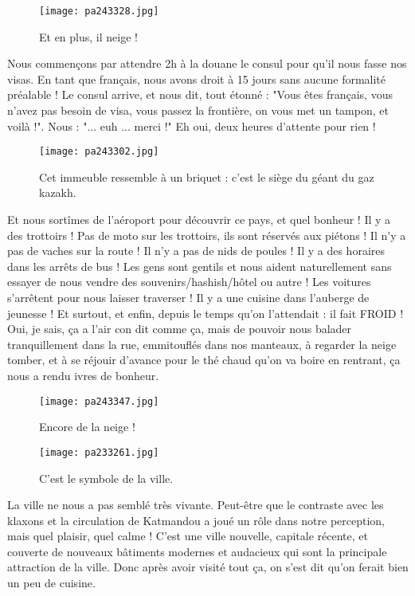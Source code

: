 \documentclass{book}
\begin{document}
\begin{figure}[h]
\centering
\texttt{[image: pa243328.jpg]}
\caption*{Et en plus, il neige !}
\end{figure}

Nous commençons par attendre 2h à la douane le consul pour qu'il nous fasse nos visas. En tant que français, nous avons droit à 15 jours sans aucune formalité préalable ! Le consul arrive, et nous dit, tout étonné : "Vous êtes français, vous n'avez pas besoin de visa, vous passez la frontière, on vous met un tampon, et voilà !". Nous : "... euh ... merci !"
Eh oui, deux heures d'attente pour rien !


\begin{figure}[h]
\centering
\texttt{[image: pa243302.jpg]}
\caption*{Cet immeuble ressemble à un briquet : c'est le siège du géant du gaz kazakh.}
\end{figure}

Et nous sortîmes de l'aéroport pour découvrir ce pays, et quel bonheur ! Il y a des trottoirs ! Pas de moto sur les trottoirs, ils sont réservés aux piétons ! Il n'y a pas de vaches sur la route ! Il n'y a pas de nids de poules ! Il y a des horaires dans les arrêts de bus ! Les gens sont gentils et nous aident naturellement sans essayer de nous vendre des souvenirs/hashish/hôtel ou autre ! Les voitures s'arrêtent pour nous laisser traverser ! Il y a une cuisine dans l'auberge de jeunesse ! Et surtout, et enfin, depuis le temps qu'on l'attendait : il fait FROID ! Oui, je sais, ça a l'air con dit comme ça, mais de pouvoir nous balader tranquillement dans la rue, emmitouflés dans nos manteaux, à regarder la neige tomber, et à se réjouir d'avance pour le thé chaud qu'on va boire en rentrant, ça nous a rendu ivres de bonheur.


\begin{figure}[h]
\centering
\texttt{[image: pa243347.jpg]}
\caption*{Encore de la neige !}
\end{figure}


\begin{figure}[h]
\centering
\texttt{[image: pa233261.jpg]}
\caption*{C'est le symbole de la ville.}
\end{figure}

La ville ne nous a pas semblé très vivante. Peut-être que le contraste avec les klaxons et la circulation de Katmandou a joué un rôle dans notre perception, mais quel plaisir, quel calme ! C'est une ville nouvelle, capitale récente, et couverte de nouveaux bâtiments modernes et audacieux qui sont la principale attraction de la ville. Donc après avoir visité tout ça, on s'est dit qu'on ferait bien un peu de cuisine.
\end{document}
